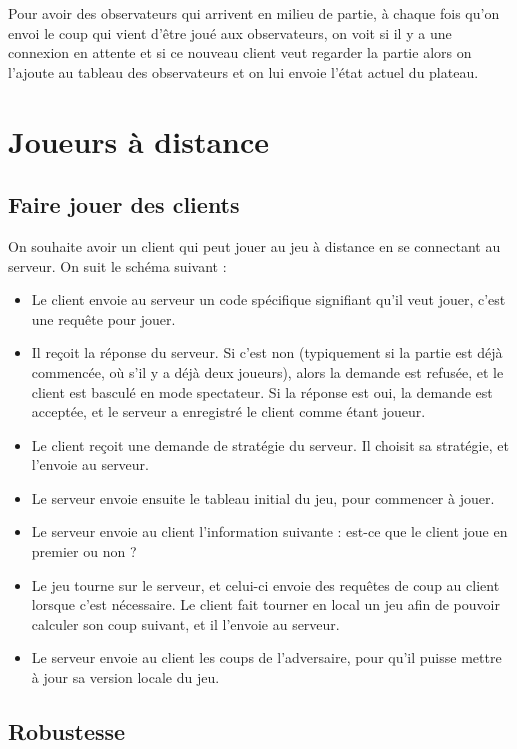 \documentclass[a4paper]{article}
\begin{document}
Pour avoir des observateurs qui arrivent en milieu de partie, à chaque fois
qu'on envoi le coup qui vient d'être joué aux observateurs, on voit si il y a
une connexion en attente et si ce nouveau client veut regarder la partie alors
on l'ajoute au tableau des observateurs et on lui envoie l'état actuel du
plateau.



\section{Joueurs à distance}

\subsection{Faire jouer des clients}

On souhaite avoir un client qui peut jouer au jeu à distance en se connectant au serveur. On suit le schéma suivant :

%
\begin{itemize}
	\setlength\itemsep{1em}
	\item Le client envoie au serveur un code spécifique signifiant qu'il veut jouer, c'est une requête pour jouer.
	\item Il reçoit la réponse du serveur. Si c'est non (typiquement si la partie est déjà commencée, où s'il y a déjà deux joueurs), alors la demande est refusée, et le client est basculé en mode spectateur. Si la réponse est oui, la demande est acceptée, et le serveur a enregistré le client comme étant joueur.
	\item Le client reçoit une demande de stratégie du serveur. Il choisit sa stratégie, et l'envoie au serveur.
	\item Le serveur envoie ensuite le tableau initial du jeu, pour commencer à jouer.
	\item Le serveur envoie au client l'information suivante : est-ce que le client joue en premier ou non ?
	\item Le jeu tourne sur le serveur, et celui-ci envoie des requêtes de coup au client lorsque c'est nécessaire. Le client fait tourner en local un jeu afin de pouvoir calculer son coup suivant, et il l'envoie au serveur.
	\item Le serveur envoie au client les coups de l'adversaire, pour qu'il puisse mettre à jour sa version locale du jeu.
\end{itemize}
%


\subsection{Robustesse}
\end{document}
